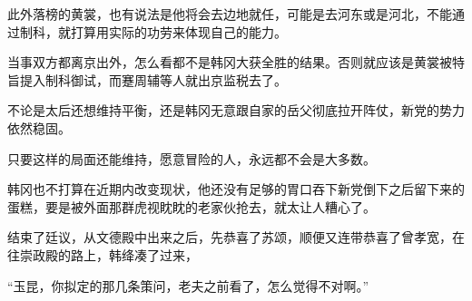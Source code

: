 此外落榜的黄裳，也有说法是他将会去边地就任，可能是去河东或是河北，不能通过制科，就打算用实际的功劳来体现自己的能力。

当事双方都离京出外，怎么看都不是韩冈大获全胜的结果。否则就应该是黄裳被特旨提入制科御试，而蹇周辅等人就出京监税去了。

不论是太后还想维持平衡，还是韩冈无意跟自家的岳父彻底拉开阵仗，新党的势力依然稳固。

只要这样的局面还能维持，愿意冒险的人，永远都不会是大多数。

韩冈也不打算在近期内改变现状，他还没有足够的胃口吞下新党倒下之后留下来的蛋糕，要是被外面那群虎视眈眈的老家伙抢去，就太让人糟心了。

结束了廷议，从文德殿中出来之后，先恭喜了苏颂，顺便又连带恭喜了曾孝宽，在往崇政殿的路上，韩绛凑了过来，

“玉昆，你拟定的那几条策问，老夫之前看了，怎么觉得不对啊。”
